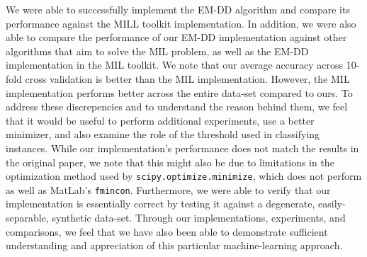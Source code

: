 \documentclass[conference]{IEEEtran}
\begin{document}
We were able to successfully implement the EM-DD algorithm and compare its performance against the MILL toolkit implementation. In addition, we were also able to compare the performance of our EM-DD implementation against other algorithms that aim to solve the MIL problem, as well as the EM-DD implementation in the MIL toolkit. We note that our average accuracy across 10-fold cross validation is better than the MIL implementation. However, the MIL implementation performs better across the entire data-set compared to ours. To address these discrepencies and to understand the reason behind them, we feel that it would be useful to perform additional experiments, use a better minimizer, and also examine the role of the threshold used in classifying instances. While our implementation's performance does not match the results in the original paper, we note that this might also be due to limitations in the optimization method used by \texttt{scipy.optimize.minimize}, which does not perform as well as MatLab's \texttt{fmincon}. Furthermore, we were able to verify that our implementation is essentially correct by testing it against a degenerate, easily-separable, synthetic data-set. Through our implementations, experiments, and comparisons, we feel that we have also been able to demonstrate sufficient understanding and appreciation of this particular machine-learning approach. 





%




\end{document}
